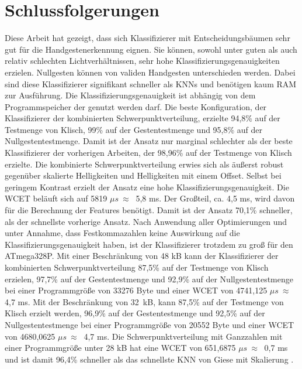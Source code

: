 \chapter{Schlussfolgerungen}
Diese Arbeit hat gezeigt, dass sich Klassifizierer mit Entscheidungsbäumen sehr gut für die Handgestenerkennung eignen. Sie können, sowohl unter guten als auch
relativ schlechten Lichtverhältnissen, sehr hohe Klassifizierungsgenauigkeiten erzielen. Nullgesten können von validen Handgesten unterschieden werden. Dabei sind diese Klassifizierer signifikant
schneller als KNNs und benötigen kaum RAM zur Ausführung. Die Klassifizierungsgenauigkeit ist abhängig von dem Programmspeicher der genutzt werden darf.
\newline
\newline
Die beste Konfiguration, der Klassifizierer der kombinierten Schwerpunktverteilung, erzielte 94,8\% auf der Testmenge von Klisch, 99\% auf der Gestentestmenge und 95,8\% auf der Nullgestentestmenge. Damit
ist der Ansatz nur marginal schlechter als der beste Klassifizierer der vorherigen Arbeiten, der 98,96\% auf der Testmenge von Klisch erzielte. Die kombinierte Schwerpunktverteilung erwies sich als
äußerst robust gegenüber skalierte Helligkeiten und Helligkeiten mit einem Offset. Selbst bei geringem Kontrast erzielt der Ansatz eine hohe Klassifizierungsgenauigkeit. Die WCET beläuft
sich auf 5819 $\mu s\ \approx\ $ 5,8 ms. Der Großteil, ca. 4,5 ms, wird davon für die Berechnung der Features benötigt. Damit ist der Ansatz 70,1\% schneller, als der schnellste vorherige Ansatz.
Nach Anwendung aller Optimierungen und unter Annahme, dass Festkommazahlen keine Auswirkung auf die Klassifizierungsgenauigkeit haben, ist der Klassifizierer trotzdem zu groß für den ATmega328P.
\newline
\newline
Mit einer Beschränkung von 48 kB kann der Klassifizierer der kombinierten Schwerpunktverteilung 87,5\% auf der Testmenge von Klisch erzielen, 97,7\% auf
der Gestentestmenge und 92,9\% auf der Nullgestentestmenge bei einer Programmgröße von 33276 Byte und einer WCET von 4741,125 $\mu s\ \approx\ $ 4,7 ms. Mit der Beschränkung von 32\ kB, kann 87,5\% auf der
Testmenge von Klisch erzielt werden, 96,9\% auf der Gestentestmenge und 92,5\% auf der Nullgestentestmenge bei einer Programmgröße von 20552 Byte und einer WCET von 4680,0625 $\mu s\ \approx\ $ 4,7 ms.
\newline
\newline
Die Schwerpunktverteilung mit Ganzzahlen mit einer Programmgröße unter 28 kB hat eine WCET von 651,6875 $\mu s\ \approx\ $ 0,7 ms und ist damit 96,4\% schneller als das schnellste KNN von Giese mit Skalierung \cite{gieseThesis}.

